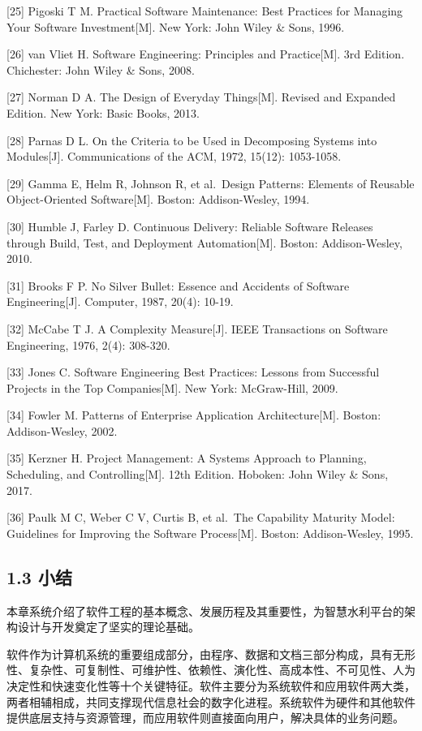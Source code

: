 {[}25{]} Pigoski T M. Practical Software Maintenance: Best Practices for Managing Your Software Investment{[}M{]}. New York: John Wiley \& Sons, 1996.

{[}26{]} van Vliet H. Software Engineering: Principles and Practice{[}M{]}. 3rd Edition. Chichester: John Wiley \& Sons, 2008.

{[}27{]} Norman D A. The Design of Everyday Things{[}M{]}. Revised and Expanded Edition. New York: Basic Books, 2013.

{[}28{]} Parnas D L. On the Criteria to be Used in Decomposing Systems into Modules{[}J{]}. Communications of the ACM, 1972, 15(12): 1053-1058.

{[}29{]} Gamma E, Helm R, Johnson R, et al.~Design Patterns: Elements of Reusable Object-Oriented Software{[}M{]}. Boston: Addison-Wesley, 1994.

{[}30{]} Humble J, Farley D. Continuous Delivery: Reliable Software Releases through Build, Test, and Deployment Automation{[}M{]}. Boston: Addison-Wesley, 2010.

{[}31{]} Brooks F P. No Silver Bullet: Essence and Accidents of Software Engineering{[}J{]}. Computer, 1987, 20(4): 10-19.

{[}32{]} McCabe T J. A Complexity Measure{[}J{]}. IEEE Transactions on Software Engineering, 1976, 2(4): 308-320.

{[}33{]} Jones C. Software Engineering Best Practices: Lessons from Successful Projects in the Top Companies{[}M{]}. New York: McGraw-Hill, 2009.

{[}34{]} Fowler M. Patterns of Enterprise Application Architecture{[}M{]}. Boston: Addison-Wesley, 2002.

{[}35{]} Kerzner H. Project Management: A Systems Approach to Planning, Scheduling, and Controlling{[}M{]}. 12th Edition. Hoboken: John Wiley \& Sons, 2017.

{[}36{]} Paulk M C, Weber C V, Curtis B, et al.~The Capability Maturity Model: Guidelines for Improving the Software Process{[}M{]}. Boston: Addison-Wesley, 1995.

\hypertarget{ux5c0fux7ed3}{%
\subsection{1.3 小结}\label{ux5c0fux7ed3}}

本章系统介绍了软件工程的基本概念、发展历程及其重要性，为智慧水利平台的架构设计与开发奠定了坚实的理论基础。

软件作为计算机系统的重要组成部分，由程序、数据和文档三部分构成，具有无形性、复杂性、可复制性、可维护性、依赖性、演化性、高成本性、不可见性、人为决定性和快速变化性等十个关键特征。软件主要分为系统软件和应用软件两大类，两者相辅相成，共同支撑现代信息社会的数字化进程。系统软件为硬件和其他软件提供底层支持与资源管理，而应用软件则直接面向用户，解决具体的业务问题。

